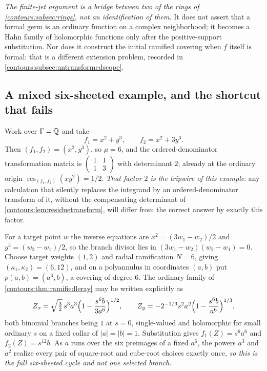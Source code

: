 \documentclass[11pt,letterpaper]{article}
\theoremstyle{definition}
\theoremstyle{remark}
\newcommand{\res}{\operatorname{res}}\newcommand{\wind}{\operatorname{wind}}
\numberwithin{equation}{section}
\begin{document}
\emph{The finite-jet argument is a bridge between two of the rings of
\cref{contours:subsec:rings}, not an identification of them.} It does not assert
that a formal germ is an ordinary function on a complex neighborhood; it becomes
a Hahn family of holomorphic functions only after the positive-support
substitution. Nor does it construct the initial ramified covering when $f$ itself
is formal: that is a different extension problem, recorded in
\cref{contours:subsec:untransformedscope}.

\subsection{A mixed six-sheeted example, and the shortcut that fails}
\label{contours:subsec:sixsheeted}

\begin{example}
\label{contours:ex:sixsheeted}
Work over $\Gamma=\mathbb Q$ and take
\begin{equation}\label{contours:eq:examplef}
  f_1=x^2+y^3,\qquad f_2=x^2+3y^3 .
\end{equation}
Then $(f_1,f_2)=(x^2,y^3)$, so $\mu=6$, and the ordered-denominator
transformation matrix is
$\left(\begin{smallmatrix}1&1\\1&3\end{smallmatrix}\right)$ with determinant
$2$; already at the ordinary origin
$\res_{(f_1,f_2)}(xy^2)=1/2$. \emph{That factor $2$ is the tripwire of this
example}: any calculation that silently replaces the integrand by an
ordered-denominator transform of it, without the compensating determinant of
\cref{contours:lem:residuetransform}, will differ from the correct answer by
exactly this factor.

For a target point $w$ the inverse equations are
$x^2=(3w_1-w_2)/2$ and $y^3=(w_2-w_1)/2$, so the branch divisor lies in
$(3w_1-w_2)(w_2-w_1)=0$. Choose target weights $(1,2)$ and radial ramification
$N=6$, giving $(\kappa_1,\kappa_2)=(6,12)$, and on a polyannulus in coordinates
$(a,b)$ put $p(a,b)=(a^6,b)$, a covering of degree $6$. The ordinary family of
\cref{contours:thm:ramifiedleray} may be written explicitly as
\begin{equation}\label{contours:eq:exampleZ}
  Z_x=\sqrt{\tfrac32}\,s^3a^3
    \Bigl(1-\frac{s^6b}{3a^6}\Bigr)^{1/2},
  \qquad
  Z_y=-2^{-1/3}s^2a^2
    \Bigl(1-\frac{s^6b}{a^6}\Bigr)^{1/3},
\end{equation}
both binomial branches being $1$ at $s=0$, single-valued and holomorphic for
small ordinary $s$ on a fixed collar of $|a|=|b|=1$. Substitution gives
$f_1(Z)=s^6a^6$ and $f_2(Z)=s^{12}b$. As $a$ runs over the six preimages of a
fixed $a^6$, the powers $a^3$ and $a^2$ realize every pair of square-root and
cube-root choices exactly once, \emph{so this is the full six-sheeted cycle and
not one selected branch}.


\end{example}
\end{document}
